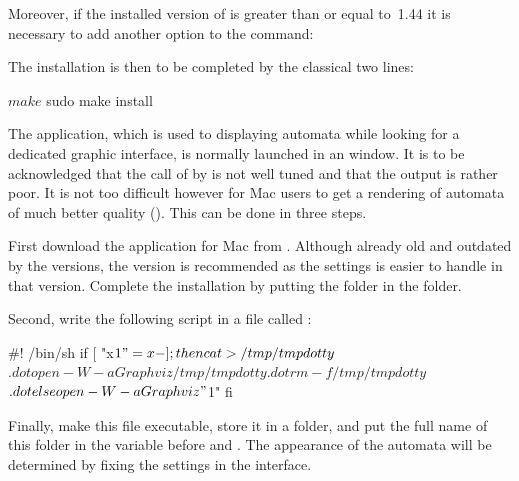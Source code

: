 Moreover, if the installed version of   is greater than
or equal to~1.44 it is necessary to add another option to the
 command:
%
The installation is then to be completed by the classical two lines:
\begin{shell}
$ make
$ sudo make install
\end{shell}%

The  application, which is used to displaying automata
while looking for a dedicated graphic interface, is normally launched
in an  window.
It is to be acknowledged that the call of  by \tafkit
is not well tuned and that the output is rather poor.
It is not too difficult however for Mac users to get a rendering of
automata of much better quality (\cf {}).
This can be done in three steps.

First download the  application for Mac from
.
Although already old and outdated by the  versions, the
 version is recommended as the settings is easier to
handle in that version.
Complete the installation by putting the  folder
in the  folder.

Second, write the following script in a file called :
\begin{shell}
#! /bin/sh
if [ "x$1" = x- ]; then
 cat >/tmp/tmpdotty$$.dot
 open -W -a Graphviz /tmp/tmpdotty$$.dot
 rm -f /tmp/tmpdotty$$.dot
else
 open -W -a Graphviz "$1"
fi
\end{shell}%

Finally, make this file executable, store it in a folder, and put the
full name of this folder in the  variable before
 and .
The appearance of the automata will be determined by fixing the
settings in the interface.


